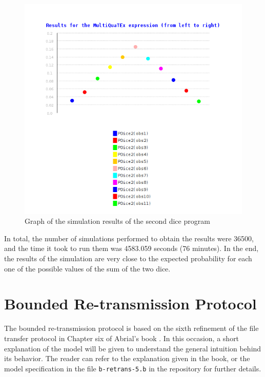 \begin{figure}[H]
    \centering
    \includegraphics[scale = 0.5]{images/CS4.png}
    \caption{Graph of the simulation results of the second dice program}
    \label{fig:ce4}
\end{figure}
In total, the number of simulations performed to obtain the results were 36500, and the time it took to run them was 4583.059 seconds (76 minutes). In the end, the results of the simulation are very close to the expected probability for each one of the possible values of the sum of the two dice.

\section{Bounded Re-transmission Protocol}
The bounded re-transmission protocol is based on the sixth refinement of the file transfer protocol in Chapter six of Abrial's book \cite{Abrial2011}. In this occasion, a short explanation of the model will be given to understand the general intuition behind its behavior. The reader can refer to the explanation given in the book, or the model specification in the file \texttt{b-retrans-5.b} in the repository for further details. 

